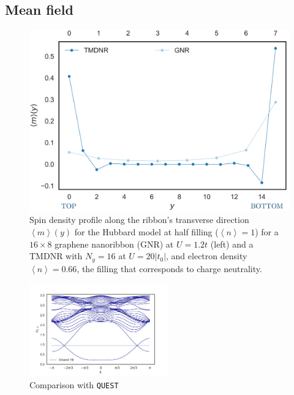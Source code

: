
\subsection{Mean field}
\label{sec:resul}
\begin{figure}[H]
\centering
\includegraphics[scale=0.5]{images/magProf.png}
	\caption{Spin density profile along the ribbon's transverse direction $\left\langle m \right\rangle (y)$ for the Hubbard model at half filling ($\left\langle n \right\rangle = 1$) for a $16 \times 8$ graphene nanoribbon (GNR) at $U=1.2t$ (left) and a TMDNR with $N_y = 16$ at $U = 20| t_0 |$, and electron density $\left\langle n \right\rangle = 0.66$, the filling that corresponds to charge neutrality.}
	\label{fig:nanoGraphVsTMD}
\end{figure}
\begin{figure}[H]
  \centering
  \includegraphics[width=6cm]{images/freeBands.png}
  \caption{Comparison with \texttt{QUEST}}
  \label{fig:blade_flow_pressure}
\end{figure}

